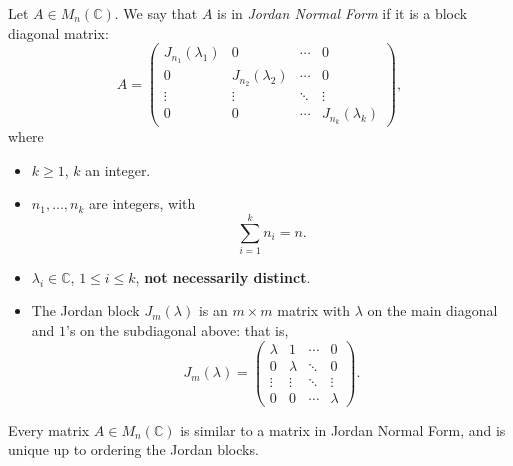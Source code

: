 \documentclass[12pt]{article}
\begin{document}
\begin{definition}
	Let $A \in M_n(\mathbb{C})$. We say that $A$ is in \textit{Jordan Normal Form} if it is a block diagonal matrix:
	\[
	A =
	\begin{pmatrix}
		J_{n_1}(\lambda_1) & 0 & \cdots & 0 \\
		0 & J_{n_2}(\lambda_2) & \cdots & 0 \\
		\vdots & \vdots & \ddots & \vdots \\
		0 & 0 & \cdots & J_{n_k}(\lambda_k)
	\end{pmatrix}
	,\]
	where
	\begin{itemize}
		\item $k \geq 1$, $k$ an integer.
		\item $n_1, \ldots, n_k$ are integers, with
			\[
			\sum_{i = 1}^{k} n_i = n
			.\]
		\item $\lambda_i \in \mathbb{C}$, $1 \leq i \leq k$, \textbf{not necessarily distinct}.
		\item The Jordan block $J_{m}(\lambda)$ is an $m \times m$ matrix with $\lambda$ on the main diagonal and $1$'s on the subdiagonal above: that is,
			\[
				J_{m}(\lambda) =
			\begin{pmatrix}
				 \lambda & 1 & \cdots & 0 \\
				 0 & \lambda & \ddots & 0 \\
				 \vdots & \vdots & \ddots & \vdots \\
				 0 & 0 & \cdots & \lambda
			\end{pmatrix}
			.\] 
	\end{itemize}
\end{definition}

\begin{theorem}
	Every matrix $A \in M_n(\mathbb{C})$ is similar to a matrix in Jordan Normal Form, and is unique up to ordering the Jordan blocks.
\end{theorem}
\end{document}
